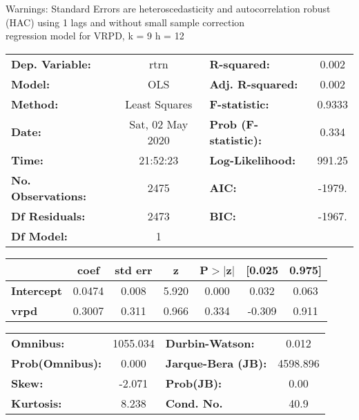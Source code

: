 Warnings: \newline
 [1] Standard Errors are heteroscedasticity and autocorrelation robust (HAC) using 1 lags and without small sample correction\\ 

regression model for VRPD, k = 9 h = 12\begin{center}
\begin{tabular}{lclc}
\toprule
\textbf{Dep. Variable:}    &       rtrn       & \textbf{  R-squared:         } &     0.002   \\
\textbf{Model:}            &       OLS        & \textbf{  Adj. R-squared:    } &     0.002   \\
\textbf{Method:}           &  Least Squares   & \textbf{  F-statistic:       } &    0.9333   \\
\textbf{Date:}             & Sat, 02 May 2020 & \textbf{  Prob (F-statistic):} &    0.334    \\
\textbf{Time:}             &     21:52:23     & \textbf{  Log-Likelihood:    } &    991.25   \\
\textbf{No. Observations:} &        2475      & \textbf{  AIC:               } &    -1979.   \\
\textbf{Df Residuals:}     &        2473      & \textbf{  BIC:               } &    -1967.   \\
\textbf{Df Model:}         &           1      & \textbf{                     } &             \\
\bottomrule
\end{tabular}
\begin{tabular}{lcccccc}
                   & \textbf{coef} & \textbf{std err} & \textbf{z} & \textbf{P$> |$z$|$} & \textbf{[0.025} & \textbf{0.975]}  \\
\midrule
\textbf{Intercept} &       0.0474  &        0.008     &     5.920  &         0.000        &        0.032    &        0.063     \\
\textbf{vrpd}      &       0.3007  &        0.311     &     0.966  &         0.334        &       -0.309    &        0.911     \\
\bottomrule
\end{tabular}
\begin{tabular}{lclc}
\textbf{Omnibus:}       & 1055.034 & \textbf{  Durbin-Watson:     } &    0.012  \\
\textbf{Prob(Omnibus):} &   0.000  & \textbf{  Jarque-Bera (JB):  } & 4598.896  \\
\textbf{Skew:}          &  -2.071  & \textbf{  Prob(JB):          } &     0.00  \\
\textbf{Kurtosis:}      &   8.238  & \textbf{  Cond. No.          } &     40.9  \\
\bottomrule
\end{tabular}
\end{center}

